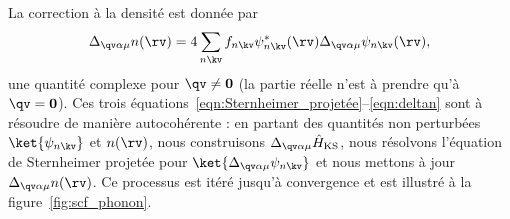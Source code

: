 La correction à la densité est donnée par
\begin{equation}
    \Delta_{\qv\alpha\mu} n(\rv) = 4\sum_{n\kv}f_{n\kv}\psi^*_{n\kv}(\rv)\Delta_{\qv\alpha\mu}\psi_{n\kv}(\rv),
    \label{eqn:deltan}
\end{equation}
une quantité complexe pour $\qv\neq\mathbf{0}$ (la partie réelle n'est à prendre qu'à $\qv=\mathbf{0}$). Ces trois équations~\eqref{eqn:Sternheimer_projetée}--\eqref{eqn:deltan} sont à résoudre de manière autocohérente : en partant des quantités non perturbées $\ket{\psi_{n\kv}}$ et $n(\rv)$, nous construisons $\Delta_{\qv\alpha\mu}\hat{H}_\text{KS}$, nous résolvons l'équation de Sternheimer projetée pour $\ket{\Delta_{\qv\alpha\mu}\psi_{n\kv}}$ et nous mettons à jour $\Delta_{\qv\alpha\mu}n(\rv)$. Ce processus est itéré jusqu'à convergence et est illustré à la figure~\ref{fig:scf_phonon}.

